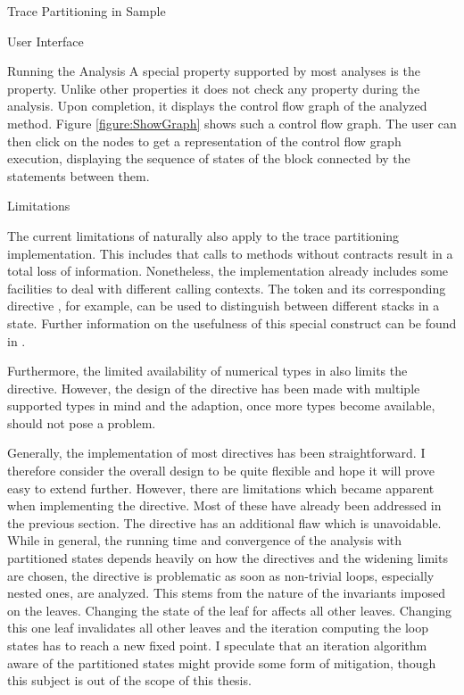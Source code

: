 \begin{chapter}{Trace Partitioning in Sample}
\begin{section}{User Interface}
\begin{subsection}{Running the Analysis}
			A special property supported by most analyses is the  property. Unlike other properties it does not check any property during the analysis. Upon completion, it displays the control flow graph of the analyzed method. Figure \ref{figure:ShowGraph} shows such a control flow graph. The user can then click on the nodes to get a representation of the control flow graph execution, displaying the sequence of states of the block connected by the statements between them.
		\end{subsection}
	\end{section}


	\begin{section}{Limitations}
		\label{section:Limitations}

		The current limitations of \sample naturally also apply to the trace partitioning implementation. This includes that calls to methods without contracts result in a total loss of information. Nonetheless, the implementation already includes some facilities to deal with different calling contexts. The  token and its corresponding directive , for example, can be used to distinguish between different stacks in a state. Further information on the usefulness of this special construct can be found in \cite{mauborgne:rival05}.

		Furthermore, the limited availability of numerical types in \sample also limits the  directive. However, the design of the directive has been made with multiple supported types in mind and the adaption, once more types become available, should not pose a problem.

		Generally, the implementation of most directives has been straightforward. I therefore consider the overall design to be quite flexible and hope it will prove easy to extend further. However, there are limitations which became apparent when implementing the  directive. Most of these have already been addressed in the previous section. The directive has an additional flaw which is unavoidable. While in general, the running time and convergence of the analysis with partitioned states depends heavily on how the directives and the widening limits are chosen, the  directive is problematic as soon as non-trivial loops, especially nested ones, are analyzed. This stems from the nature of the invariants imposed on the leaves. Changing the state of the leaf for  affects all other leaves. Changing this one leaf invalidates all other leaves and the iteration computing the loop states has to reach a new fixed point. I speculate that an iteration algorithm aware of the partitioned states might provide some form of mitigation, though this subject is out of the scope of this thesis.
	\end{section}

\end{chapter}
